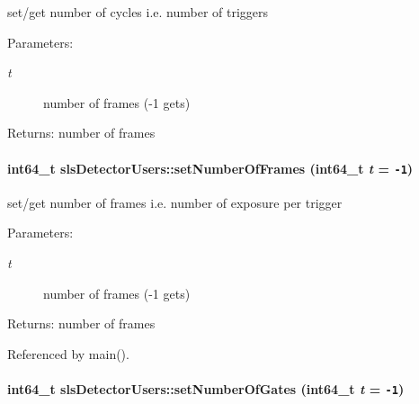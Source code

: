 set/get number of cycles i.e. number of triggers 

\begin{Desc}
\item[Parameters:]
\begin{description}
\item[{\em t}]number of frames (-1 gets) \end{description}
\end{Desc}
\begin{Desc}
\item[Returns:]number of frames \end{Desc}
\hypertarget{classslsDetectorUsers_fc82f608bf74d10f3aa866bff94cbbab}{
\paragraph[setNumberOfFrames]{\setlength{\rightskip}{0pt plus 5cm}int64\_\-t sls\-Detector\-Users::set\-Number\-Of\-Frames (int64\_\-t {\em t} = {\tt -1})}\hfill}
\label{classslsDetectorUsers_fc82f608bf74d10f3aa866bff94cbbab}


set/get number of frames i.e. number of exposure per trigger 

\begin{Desc}
\item[Parameters:]
\begin{description}
\item[{\em t}]number of frames (-1 gets) \end{description}
\end{Desc}
\begin{Desc}
\item[Returns:]number of frames \end{Desc}


Referenced by main().\hypertarget{classslsDetectorUsers_61d4acb00c997c5e02be6a191401c4ce}{
\paragraph[setNumberOfGates]{\setlength{\rightskip}{0pt plus 5cm}int64\_\-t sls\-Detector\-Users::set\-Number\-Of\-Gates (int64\_\-t {\em t} = {\tt -1})}\hfill}
\label{classslsDetectorUsers_61d4acb00c997c5e02be6a191401c4ce}


